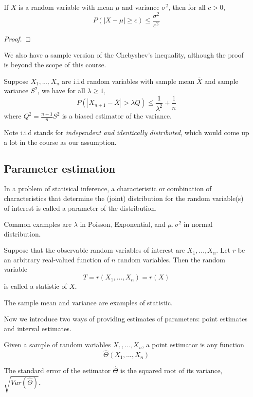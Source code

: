 \documentclass[11pt]{article}
\begin{document}
\begin{theorem}
  If \(X\) is a random variable with mean \(\mu\) and variance \(\sigma^2\), then for all \(c>0\),
  \[P(|X-\mu|\geq c)\leq\frac{\sigma^2}{c^2}\]
\end{theorem}
\begin{proof}
  
\end{proof}

We also have a sample version of the Chebyshev's inequality, although the proof is beyond the scope of this course.
\begin{theorem}
  Suppose \(X_1,...,X_n\) are i.i.d random variables with sample mean \(\overline{X}\) and sample variance \(S^2\), we have for all \(\lambda\geq 1\),
  \[P(|X_{n+1}-\overline{X}|>\lambda Q)\leq \frac{1}{\lambda^2}+\frac{1}{n}\]
  where \(Q^2=\frac{n+1}{n}S^2\) is a biased estimator of the variance.
\end{theorem}
Note i.i.d stands for \emph{independent and identically distributed}, which would come up a lot in the course as our assumption.
\subsection{Parameter estimation}
\begin{definition}[Parameter]
  In a problem of statisical inference, a characteristic or combination of characteristics that determine the (joint) distribution for the random variable(s) of interest is called a parameter of the distribution.
\end{definition}
Common examples are \(\lambda\) in Poisson, Exponential, and \(\mu,\sigma^2\) in normal distribution.

\begin{definition}[Statistic]
  Suppose that the observable random variables of interest are \(X_1,...,X_n\). Let \(r\) be an arbitrary real-valued function of \(n\) random variables. Then the random variable \[T=r(X_1,...,X_n)=r(X)\] is called a statistic of \(X\).
\end{definition}
The sample mean and variance are examples of statistic.

\vspace{5pt}Now we introduce two ways of providing estimates of parameters: point estimates and interval estimates.

\begin{definition}
  Given a sample of random variables \(X_1,...,X_n\), a point estimator is any function \[\hat{\Theta}(X_1,...,X_n)\]
\end{definition}
\begin{definition}
  The standard error of the estimator \(\hat{\Theta}\) is the squared root of its variance, \(\sqrt{Var(\hat{\Theta})}\).
\end{definition}
\end{document}
